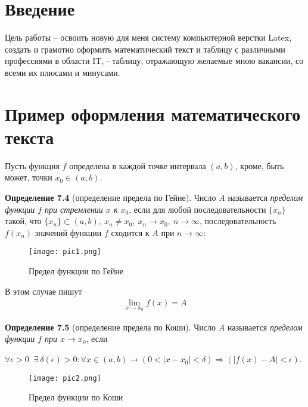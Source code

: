 \section*{Введение}
Цель работы – освоить новую для меня систему компьютерной верстки Latex, создать и грамотно оформить математический текст и таблицу с различными профессиями в области IT, - таблицу, отражающую желаемые мною вакансии, со всеми их плюсами и минусами.


\newpage
\section{Пример оформления математического текста}
Пусть функция $f$ определена в каждой точке интервала $(a, b)$, кроме, быть может, точки $x_0 \in (a, b)$.

\textbf {Определение 7.4} (определение предела по Гейне).
Число $A$ называется \textit{ пределом функции $f$ при стремлении
$x$ к $x_0$}, если для любой последовательности $\{x_n\}$ такой, что
$\{x_n\} \subset (a, b), \: x_n \neq x_0, \: x_n \rightarrow x_0, \: n \rightarrow \infty$, последовательность $f(x_n)$ значений функции $f$ сходится к $A$ при $n \rightarrow \infty$:

\begin{figure}[H]
\centerline{\texttt{[image: pic1.png]}}
\caption{Предел функции по Гейне}
\end{figure}

В этом случае пишут
\begin{eqnarray}
\lim_{x\to x_0} f(x)=A
\end{eqnarray}

\textbf{Определение 7.5} (определение предела по Коши).
Число $A$ называется \textit{пределом функции $f$ при $x \rightarrow x_0$}, если

\centerline{$\forall \epsilon >0 \; \; \exists \: \delta (\epsilon) >0 : \forall x \in (a,b) \rightarrow (0<|x-x_0|<\delta) \Rightarrow (|f(x)-A|<\epsilon)$.}

\begin{figure}[H]
\centerline{\texttt{[image: pic2.png]}}
\caption{Предел функции по Коши}
\end{figure}

